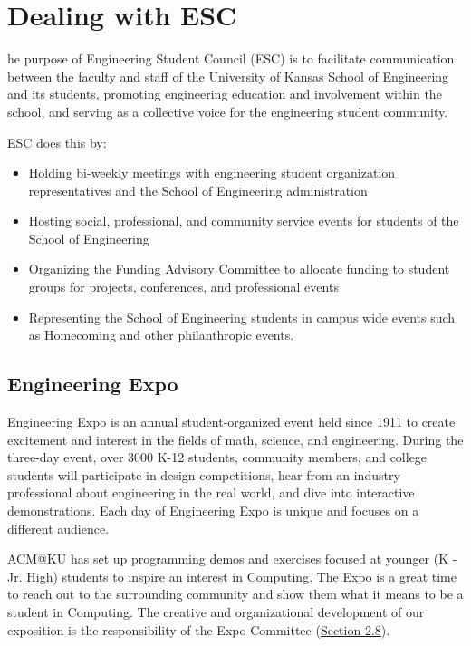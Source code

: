 %
%
\let\textcircled=\pgftextcircled
\chapter{Dealing with ESC}
\label{chap:esc}

he purpose of Engineering Student Council (ESC) is to facilitate
communication between the faculty and staff of the University of Kansas School
of Engineering and its students, promoting engineering education and involvement
within the school, and serving as a collective voice for the engineering student
community.

ESC does this by:
\begin{itemize}
  \item Holding bi-weekly meetings with engineering student organization
        representatives and the School of Engineering administration
  \item Hosting social, professional, and community service events for students
        of the School of Engineering
  \item Organizing the Funding Advisory Committee to allocate funding to student
        groups for projects, conferences, and professional events
  \item Representing the School of Engineering students in campus wide events
        such as Homecoming and other philanthropic events.
\end{itemize}


\section{Engineering Expo}
\label{sec:sec01}

Engineering Expo is an annual student-organized event held since 1911 to create
excitement and interest in the fields of math, science, and engineering. During
the three-day event, over 3000 K-12 students, community members, and college
students will participate in design competitions, hear from an industry
professional about engineering in the real world, and dive into interactive
demonstrations.  Each day of Engineering Expo is unique and focuses on a
different audience.

ACM@KU has set up programming demos and exercises focused at younger (K - Jr.
High) students to inspire an interest in Computing. The Expo is a great time to
reach out to the surrounding community and show them what it means to be a
student in Computing. The creative and organizational development of our
exposition is the responsibility of the Expo Committee
(\hyperref[sec:committees]{Section 2.8}).

